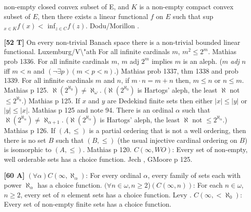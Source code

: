 non-empty closed convex subset of E, and $K$ is a non-empty compact
convex subset of $E$, then there exists a linear functional $f$ on $E$
such that  sup$_{x\in K}f(x) <$ inf$_{z\in C}f(z)$. \ac{Dodu/Morillon}
\cite{1999}.
\smallskip
\item{}{\bf [52 T]}  On every non-trivial Banach space there
is a non-trivial bounded linear functional.  \ac{Luxemburg/V\"ath}
\cite{2001}  
\medskip
{} For all infinite cardinals $m$, $m^2\le
2^m$.  \ac{Mathias} \cite{1979} prob 1336.
\medskip
{} For all infinite cardinals $m$, $m$ adj $2^{m}$
implies $m$ is an aleph.  ($m$ {\it adj} $n$ iff $m < n$ and $(\neg
\exists p) (m<p<n)$.)  \ac{Mathias} \cite{1979} prob 1337, thm 1338 and
prob 1339.
\medskip
{}  For all infinite cardinals $m$ and $n$, if
$m\cdot n = m + n$ then, $m \le  n$ or $n \le m$. \ac{Mathias} \cite{1979}
p 125.
\medskip
{} $\aleph(2^{\aleph_{0}})\neq\aleph_{\omega}$.
($\aleph(2^{\aleph_{0}})$ is Hartogs' aleph, the least $\aleph$
not $\le 2^{\aleph_{0}}$.)  \ac{Mathias} \cite{1979} p 125.
\medskip
{} If $x$ and $y$ are Dedekind finite sets then either
$|x|\le |y|$ or $|y|\le |x|$.  \ac{Mathias} \cite{1979} p 125 and note 94.
\medskip
{}  There is an ordinal $\alpha$ such that
$\aleph(2^{\aleph_{\alpha }})\neq\aleph_{\alpha +1}$.
($\aleph(2^{\aleph_{\alpha}})$ is Hartogs' aleph, the least $\aleph$
not $\le 2^{\aleph _{\alpha}}$.) \ac{Mathias} \cite{1979} p 126.
\medskip
{} If $(A,\le)$ is a partial ordering that
is not a well ordering, then there is no set $B$ such that $(B,\le)$
(the usual injective cardinal ordering on $B$) is isomorphic to
$(A,\le)$.  \ac{Mathias} \cite{1979} p 120.
\medskip
{} $C(\infty,WO)$: Every set of non-empty, well
orderable sets has a choice function. \ac{Jech} \cite{1973b}, G\.
\ac{Moore} \cite{1982} p 125.
\smallskip
\item{}{\bf [60 A]}  $(\forall\alpha) C(\infty,\aleph_{\alpha})$:
For every ordinal $\alpha$, every family of sets each with power
$\aleph_{\alpha }$ has a choice function.
\medskip
{} $(\forall n\in\omega, n\ge 2$)$(C(\infty,n))$:
For each $n\in\omega$, $n\ge 2$, every set of $n$ element  sets
has a choice function.  \ac{Levy} \cite{1962}.
\medskip
{}  $C(\infty,< \aleph_{0})$:  Every set of non-empty
finite  sets  has  a choice function.
